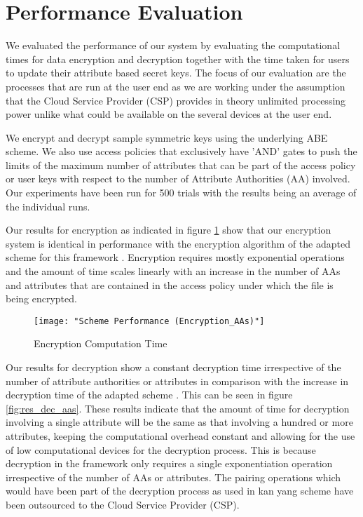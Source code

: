\section{Performance Evaluation}

We evaluated the performance of our system by evaluating the computational times for data encryption and decryption together with the time taken for users to update their attribute based secret keys. The focus of our evaluation are the processes that are run at the user end as we are working under the assumption that the Cloud Service Provider (CSP) provides in theory unlimited processing power unlike what could be available on the several devices at the user end.

We encrypt and decrypt sample symmetric keys using the underlying ABE scheme. We also use access policies that exclusively have 'AND' gates to push the limits of the maximum number of attributes that can be part of the access policy or user keys with respect to the number of Attribute Authorities (AA) involved. Our experiments have been run for 500 trials with the results being an average of the individual runs.

Our results for encryption as indicated in figure \ref{fig:res_enc_aas} show that our encryption system is identical in performance with the encryption algorithm of the adapted scheme for this framework \cite{Yang2014}. Encryption requires mostly exponential operations and the amount of time scales linearly with an increase in the number of AAs and attributes that are contained in the access policy under which the file is being encrypted.

\begin{figure}[]
	\centering
	\texttt{[image: "Scheme Performance (Encryption\_AAs)"]}
	\caption{Encryption Computation Time}
	\label{fig:res_enc_aas}
\end{figure}

Our results for decryption show a constant decryption time irrespective of the number of attribute authorities or attributes in comparison with the increase in decryption time of the adapted scheme \cite{Yang2014}. This can be seen in figure \ref{fig:res_dec_aas}. These results indicate that the amount of time for decryption involving a single attribute will be the same as that involving a hundred or more attributes, keeping the computational overhead constant and allowing for the use of low computational devices for the decryption process. This is because decryption in the framework only requires a single exponentiation operation irrespective of the number of AAs or attributes. The pairing operations which would have been part of the decryption process as used in kan yang scheme\cite{Yang2014} have been outsourced to the Cloud Service Provider (CSP).

